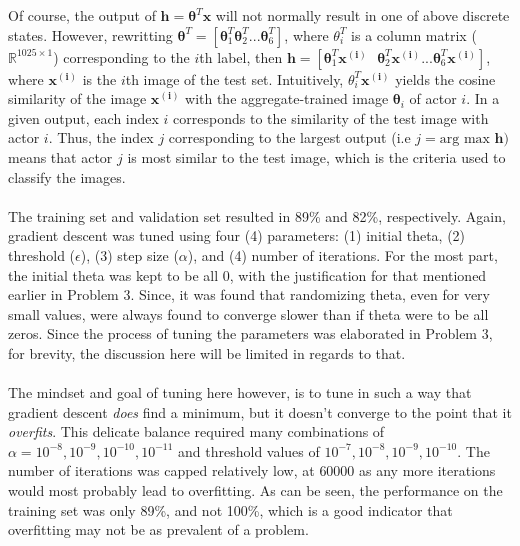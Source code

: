 \documentclass{article}
\begin{document}
Of course, the output of $\mathbf{h}=\boldsymbol \theta^T \mathbf{x}$ will not normally result in one of above discrete states. However, rewritting $\boldsymbol \theta^T = [\boldsymbol \theta_1^T \boldsymbol \theta_2^T... \boldsymbol \theta_6^T]$, where $\theta_i^T$ is a column matrix ($\mathbb{R}^{1025 \times 1}$) corresponding to the $i$th label, then $\mathbf{h} = [\boldsymbol \theta_1^T \mathbf{x^{(i)}} \text{ } \boldsymbol \theta_2^T \mathbf{x^{(i)}}... \boldsymbol \theta_6^T \mathbf{x^{(i)}}]$, where $\mathbf{x^{(i)}}$ is the $i$th image of the test set. Intuitively, $\theta_i^T \mathbf{x^{(i)}}$ yields the cosine similarity of the image $\mathbf{x^{(i)}}$ with the aggregate-trained image $\boldsymbol \theta_i$ of actor $i$. In a given output, each index $i$ corresponds to the similarity of the test image with actor $i$. Thus, the index $j$ corresponding to the largest output (i.e $j=\text{arg max } \mathbf{h})$ means that actor $j$ is most similar to the test image, which is the criteria used to classify the images.\\
\\
The training set and validation set resulted in 89\% and 82\%, respectively. Again, gradient descent was tuned using four (4) parameters: (1) initial theta, (2) threshold ($\epsilon$), (3) step size ($\alpha$), and (4) number of iterations. For the most part, the initial theta was kept to be all 0, with the justification for that mentioned earlier in Problem 3. Since, it was found that randomizing theta, even for very small values, were always found to converge slower than if theta were to be all zeros. Since the process of tuning the parameters was elaborated in Problem 3, for brevity, the discussion here will be limited in regards to that.\\
\\
The mindset and goal of tuning here however, is to tune in such a way that gradient descent \textit{does} find a minimum, but it doesn't converge to the point that it \textit{overfits}. This delicate balance required many combinations of $\alpha = 10^{-8}, 10^{-9}, 10^{-10}, 10^{-11}$ and threshold values of $10^{-7}, 10^{-8}, 10^{-9}, 10^{-10}$. The number of iterations was capped relatively low, at $60000$ as any more iterations would most probably lead to overfitting. As can be seen, the performance on the training set was only 89\%, and not 100\%, which is a good indicator that overfitting may not be as prevalent of a problem. \\
\\
\\
\end{document}
